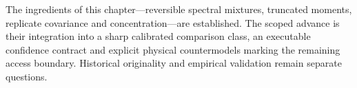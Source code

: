 The ingredients of this chapter---reversible spectral mixtures, truncated
moments, replicate covariance and concentration---are established. The scoped
advance is their integration into a sharp calibrated comparison class, an
executable confidence contract and explicit physical countermodels marking the
remaining access boundary. Historical originality and empirical validation
remain separate questions.
